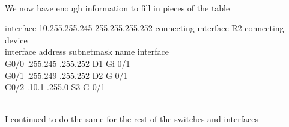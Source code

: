 \documentclass[../EngineeringJournal_CDavis.tex]{subfiles}
\begin{document}
\\
We now have enough information to fill in pieces of the table

\begin{tabbing}
  interface \= 10.255.255.245 \= 255.255.255.252 \= connecting \= interface\kill
  R2 \> \> \> connecting \> device\\
interface \> address \> subnetmask \> name \> interface\\
G0/0 .255.245 .255.252 \> D1 \> Gi 0/1 \\
G0/1 .255.249 .255.252 \> D2 \> G 0/1 \\
G0/2 .10.1 .255.0 \> S3 \> G 0/1
\end{tabbing}

\newpage


\\
I continued to do the same for the rest of the switches and interfaces
\end{document}
